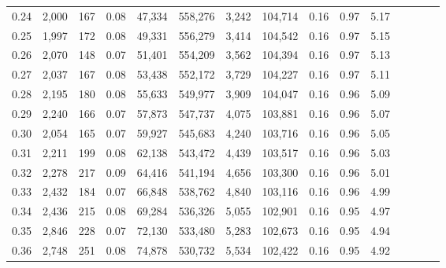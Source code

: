 \begin{tabular}{rrrcrrrrrrrrrrr}
0.24 &   2,000 &    167 &                                       0.08 &   47,334 &  558,276 &    3,242 &  104,714 &  0.16 &  0.97 &                         5.17 \\
0.25 &   1,997 &    172 &                                       0.08 &   49,331 &  556,279 &    3,414 &  104,542 &  0.16 &  0.97 &                         5.15 \\
0.26 &   2,070 &    148 &                                       0.07 &   51,401 &  554,209 &    3,562 &  104,394 &  0.16 &  0.97 &                         5.13 \\
0.27 &   2,037 &    167 &                                       0.08 &   53,438 &  552,172 &    3,729 &  104,227 &  0.16 &  0.97 &                         5.11 \\
0.28 &   2,195 &    180 &                                       0.08 &   55,633 &  549,977 &    3,909 &  104,047 &  0.16 &  0.96 &                         5.09 \\
0.29 &   2,240 &    166 &                                       0.07 &   57,873 &  547,737 &    4,075 &  103,881 &  0.16 &  0.96 &                         5.07 \\
0.30 &   2,054 &    165 &                                       0.07 &   59,927 &  545,683 &    4,240 &  103,716 &  0.16 &  0.96 &                         5.05 \\
0.31 &   2,211 &    199 &                                       0.08 &   62,138 &  543,472 &    4,439 &  103,517 &  0.16 &  0.96 &                         5.03 \\
0.32 &   2,278 &    217 &                                       0.09 &   64,416 &  541,194 &    4,656 &  103,300 &  0.16 &  0.96 &                         5.01 \\
0.33 &   2,432 &    184 &                                       0.07 &   66,848 &  538,762 &    4,840 &  103,116 &  0.16 &  0.96 &                         4.99 \\
0.34 &   2,436 &    215 &                                       0.08 &   69,284 &  536,326 &    5,055 &  102,901 &  0.16 &  0.95 &                         4.97 \\
0.35 &   2,846 &    228 &                                       0.07 &   72,130 &  533,480 &    5,283 &  102,673 &  0.16 &  0.95 &                         4.94 \\
0.36 &   2,748 &    251 &                                       0.08 &   74,878 &  530,732 &    5,534 &  102,422 &  0.16 &  0.95 &                         4.92 \\

\end{tabular}
